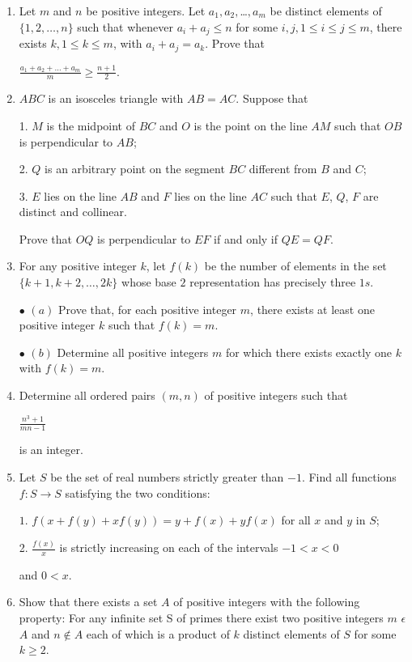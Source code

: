 \documentclass{article}
\begin{document}
\begin{enumerate}


\item Let $m$ and $n$ be positive integers. Let $a_1, a_2, $\dots$ , a_m$ be distinct elements of $\{1, 2, \dots , n\}$ such that whenever $a_i + a_j \leq n$ for some $i, j, 1 \leq i \leq j \leq m$, there exists $k, 1 \leq k \leq m$, with $a_i + a_j = a_k$. Prove that 

$\frac{a_1+a_2+\dots+a_m}{m} \geq \frac{n+1}{2}$.

\item $ABC$ is an isosceles triangle with $AB = AC$. Suppose that 

1. $M$ is the midpoint of $BC$ and $O$ is the point on the line $AM$ such that $OB$ is perpendicular to $AB$;

2. $Q$ is an arbitrary point on the segment $BC$ different from $B$ and $C$;

3. $E$ lies on the line $AB$ and $F$ lies on the line $AC$ such that $E$, $Q$, $F$ are distinct and collinear.

Prove that $OQ$ is perpendicular to $EF$ if and only if $QE=QF$.

\item For any positive integer $k$, let $f(k)$ be the number of elements in the set $\{ k+1, k+2, \dots, 2k \}$ whose base $2$ representation has precisely three $1s$. 

$\bullet$ $(a)$ Prove that, for each positive integer $m$, there exists at least one positive integer $k$ such that $f(k)=m$.

$\bullet$ $(b)$ Determine all positive integers $m$ for which there exists exactly one $k$ with $f(k)=m$.

\item Determine all ordered pairs $(m,n)$ of positive integers such that

$\frac{{n^{3}}+1}{mn-1}$ 

is an integer.

\item Let $S$ be the set of real numbers strictly greater than $-1$. Find all functions $f : S \rightarrow S$  satisfying the two conditions:

$1$. $f(x + f(y) + xf(y)) = y + f(x) + yf(x)$ for all $x$ and $y$ in $S$; 


2. $\frac{f(x)}{x}$ is strictly increasing on each of the intervals $-1<x<0$ 

and $0<x$.

\item Show that there exists a set $A$ of positive integers with the following property: For any infinite set {S} of primes there exist two positive integers $m$ $\epsilon$ $A$ and $n \notin A$ each of which is a product of $k$ distinct elements of $S$ for some $k \geq 2$.
\end{enumerate}
\end{document}
